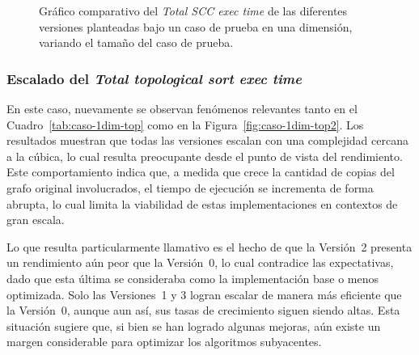 \begin{figure}[htbp]
  \centering
  \caption{Gráfico comparativo del \textit{Total SCC exec time} de las diferentes versiones planteadas bajo un caso de prueba en una dimensión, variando el tamaño del caso de prueba.}
  \label{fig:caso-1dim-scc2}
\end{figure}


\subsubsection{Escalado del \textit{Total topological sort exec time}}

En este caso, nuevamente se observan fenómenos relevantes tanto en el Cuadro~\ref{tab:caso-1dim-top} como en la Figura~\ref{fig:caso-1dim-top2}. Los resultados muestran que todas las versiones escalan con una complejidad cercana a la cúbica, lo cual resulta preocupante desde el punto de vista del rendimiento. Este comportamiento indica que, a medida que crece la cantidad de copias del grafo original involucrados, el tiempo de ejecución se incrementa de forma abrupta, lo cual limita la viabilidad de estas implementaciones en contextos de gran escala.

Lo que resulta particularmente llamativo es el hecho de que la Versión~2 presenta un rendimiento aún peor que la Versión~0, lo cual contradice las expectativas, dado que esta última se consideraba como la implementación base o menos optimizada. Solo las Versiones~1 y 3 logran escalar de manera más eficiente que la Versión~0, aunque aun así, sus tasas de crecimiento siguen siendo altas. Esta situación sugiere que, si bien se han logrado algunas mejoras, aún existe un margen considerable para optimizar los algoritmos subyacentes.


